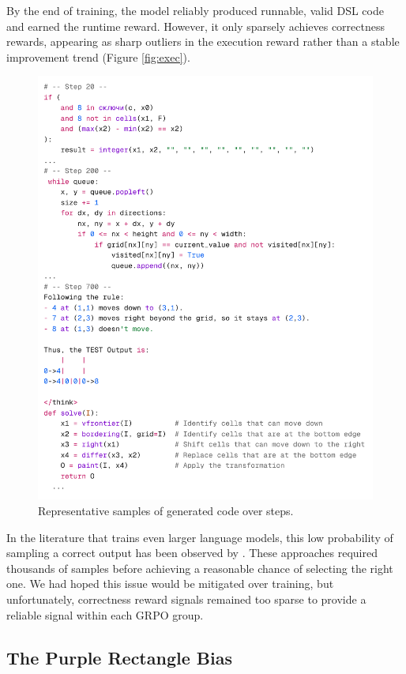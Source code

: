 \documentclass{article}
\begin{document}
By the end of training, the model reliably produced runnable, valid DSL code and earned the runtime reward. However, it only sparsely achieves correctness rewards, appearing as sharp outliers in the execution reward rather than a stable improvement trend (Figure \ref{fig:exec}).

\begin{figure}[H]
  \centering
  \includegraphics[width=0.95\columnwidth]{bin/codegens.png}
  \caption{Representative samples of generated code over steps.}
  \label{fig:codegens}
\end{figure}


In the literature that trains even larger language models, this low probability of sampling a correct output has been observed by \cite{Greenblatt, Jeremy}. These approaches required thousands of samples before achieving a reasonable chance of selecting the right one. We had hoped this issue would be mitigated over training, but unfortunately, correctness reward signals remained too sparse to provide a reliable signal within each GRPO group.

\subsection{The Purple Rectangle Bias}
\end{document}
